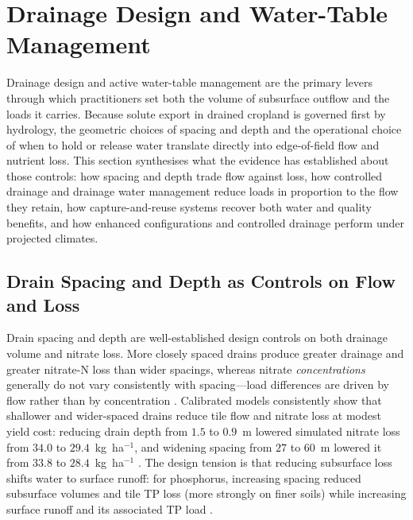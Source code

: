 \section{Drainage Design and Water-Table Management}

Drainage design and active water-table management are the primary levers
through which practitioners set both the volume of subsurface outflow and the
loads it carries. Because solute export in drained cropland is governed first
by hydrology, the geometric choices of spacing and depth and the operational
choice of when to hold or release water translate directly into edge-of-field
flow and nutrient loss. This section synthesises what the evidence has
established about those controls: how spacing and depth trade flow against
loss, how controlled drainage and drainage water management reduce loads in
proportion to the flow they retain, how capture-and-reuse systems recover both
water and quality benefits, and how enhanced configurations and controlled
drainage perform under projected climates.

\subsection{Drain Spacing and Depth as Controls on Flow and Loss}

Drain spacing and depth are well-established design controls on both drainage
volume and nitrate loss. More closely spaced drains produce greater drainage
and greater nitrate-N loss than wider spacings, whereas nitrate
\emph{concentrations} generally do not vary consistently with spacing---load
differences are driven by flow rather than by concentration
\parencite{Kladivko2021,Kladivko2004}. Calibrated models consistently show that
shallower and wider-spaced drains reduce tile flow and nitrate loss at modest
yield cost: reducing drain depth from $1.5$ to $0.9$~m lowered simulated
nitrate loss from $34.0$ to $29.4$~kg~ha$^{-1}$, and widening spacing from $27$
to $60$~m lowered it from $33.8$ to $28.4$~kg~ha$^{-1}$
\parencite{Moriasi2013,Nangia2010c,Davis2000,Hwang2024}. The design tension is
that reducing subsurface loss shifts water to surface runoff: for phosphorus,
increasing spacing reduced subsurface volumes and tile TP loss (more strongly
on finer soils) while increasing surface runoff and its associated TP load
\parencite{Morrison2013}.


